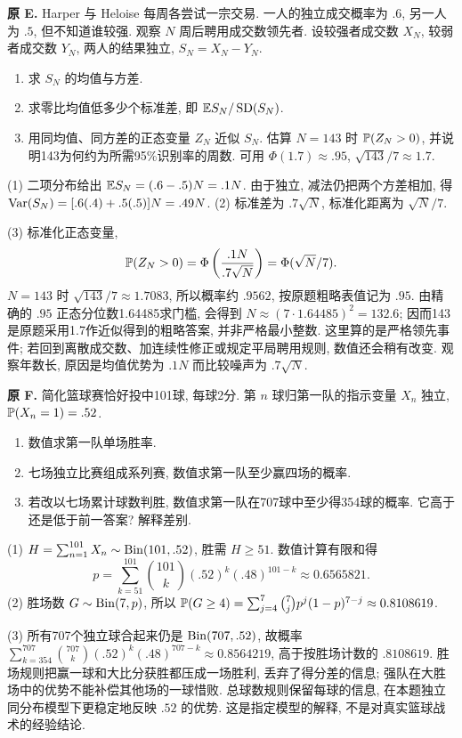 \begin{exercise}\label{ex:P6.E}
\textbf{原 E.} Harper 与 Heloise 每周各尝试一宗交易. 一人的独立成交概率为 $.6$, 另一人为 $.5$, 但不知道谁较强. 观察 $N$ 周后聘用成交数领先者. 设较强者成交数 $X_N$, 较弱者成交数 $Y_N$, 两人的结果独立, $S_N=X_N-Y_N$.
\begin{enumerate}[label=\arabic*.]
\item\label{part:P6.E.1} 求 $S_N$ 的均值与方差.
\item\label{part:P6.E.2} 求零比均值低多少个标准差, 即 $\mathbb E S_N/\operatorname{SD}(S_N)$.
\item\label{part:P6.E.3} 用同均值、同方差的正态变量 $Z_N$ 近似 $S_N$. 估算 $N=143$ 时 $\mathbb P(Z_N>0)$, 并说明143为何约为所需95\%识别率的周数. 可用 $\Phi(1.7)\approx.95$, $\sqrt{143}/7\approx1.7$.
\end{enumerate}
\end{exercise}
\begin{solution}\label{sol:P6.E}
(1) 二项分布给出 $\mathbb E S_N=(.6-.5)N=.1N$. 由于独立, 减法仍把两个方差相加, 得 $\operatorname{Var}(S_N)=[.6(.4)+.5(.5)]N=.49N$. (2) 标准差为 $.7\sqrt N$, 标准化距离为 $\sqrt N/7$.

(3) 标准化正态变量,
\[
 \mathbb P(Z_N>0)=\Phi\left(\frac{.1N}{.7\sqrt N}\right)
 =\Phi(\sqrt N/7).
\]
$N=143$ 时 $\sqrt{143}/7\approx1.7083$, 所以概率约 $.9562$, 按原题粗略表值记为 $.95$. 由精确的 $.95$ 正态分位数1.64485求门槛, 会得到 $N\approx(7\cdot1.64485)^2=132.6$; 因而143是原题采用1.7作近似得到的粗略答案, 并非严格最小整数. 这里算的是严格领先事件; 若回到离散成交数、加连续性修正或规定平局聘用规则, 数值还会稍有改变. 观察年数长, 原因是均值优势为 $.1N$ 而比较噪声为 $.7\sqrt N$.
\end{solution}

\begin{exercise}\label{ex:P6.F}
\textbf{原 F.} 简化篮球赛恰好投中101球, 每球2分. 第 $n$ 球归第一队的指示变量 $X_n$ 独立, $\mathbb P(X_n=1)=.52$.
\begin{enumerate}[label=\arabic*.]
\item\label{part:P6.F.1} 数值求第一队单场胜率.
\item\label{part:P6.F.2} 七场独立比赛组成系列赛, 数值求第一队至少赢四场的概率.
\item\label{part:P6.F.3} 若改以七场累计球数判胜, 数值求第一队在707球中至少得354球的概率. 它高于还是低于前一答案? 解释差别.
\end{enumerate}
\end{exercise}
\begin{solution}\label{sol:P6.F}
(1) $H=\sum_{n=1}^{101}X_n\sim\operatorname{Bin}(101,.52)$, 胜需 $H\ge51$. 数值计算有限和得
\[
 p=\sum_{k=51}^{101}\binom{101}{k}(.52)^k(.48)^{101-k}
 \approx0.6565821.
\]
(2) 胜场数 $G\sim\operatorname{Bin}(7,p)$, 所以 $\mathbb P(G\ge4)=\sum_{j=4}^7\binom7j p^j(1-p)^{7-j}\approx0.8108619$.

(3) 所有707个独立球合起来仍是 $\operatorname{Bin}(707,.52)$, 故概率
$\sum_{k=354}^{707}\binom{707}{k}(.52)^k(.48)^{707-k}\approx0.8564219$, 高于按胜场计数的 $.8108619$. 胜场规则把赢一球和大比分获胜都压成一场胜利, 丢弃了得分差的信息; 强队在大胜场中的优势不能补偿其他场的一球惜败. 总球数规则保留每球的信息, 在本题独立同分布模型下更稳定地反映 $.52$ 的优势. 这是指定模型的解释, 不是对真实篮球战术的经验结论.
\end{solution}

